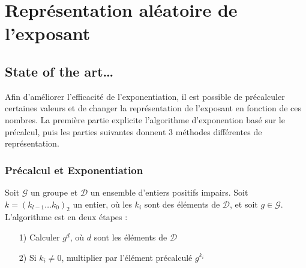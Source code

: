 \documentclass[12pt, a4paper]{memoir}
\begin{document}






\chapter{Représentation aléatoire de l'exposant}
\section{State of the art\dots}

Afin d'améliorer l'efficacité de l'exponentiation, il est possible de précalculer certaines valeurs et de changer la représentation
de l'exposant en fonction de ces nombres.
La première partie explicite l'algorithme d'exponention basé sur le précalcul, puis les parties suivantes donnent $3$ méthodes
différentes de représentation.

\subsection{Précalcul et Exponentiation}

Soit $\mathcal{G}$ un groupe et $\mathcal{D}$ un ensemble d'entiers positifs impairs.
Soit $k=(k_{l-1} \ldots k_0)_2$ un entier, où les $k_i$ sont des éléments de $\mathcal{D}$, et soit $g \in \mathcal{G}$.
L'algorithme est en deux étapes :
\begin{itemize}
 \item [1)] Calculer $g^d$, où $d$ sont les éléments de $\mathcal{D}$
 \item [2)] Si $k_i \neq 0$, multiplier par l'élément précalculé $g^{k_i}$
\end{itemize}
\end{document}
